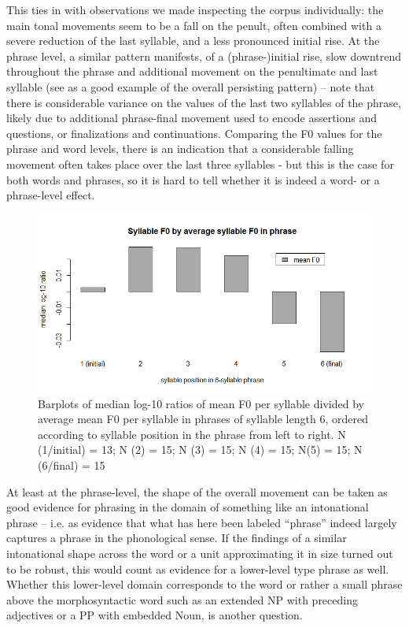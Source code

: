 \documentclass[output=paper]{LSP/langsci}
\begin{document}
This ties in with observations we made inspecting the corpus individually: the main tonal movements seem to be a fall on the penult, often combined with a severe reduction of the last syllable, and a less pronounced initial rise. At the phrase level, a similar pattern manifests, of a (phrase-)initial rise, slow downtrend throughout the phrase and additional movement on the penultimate and last syllable (see   as a good example of the overall persisting pattern) – note that there is considerable variance on the values of the last two syllables of the phrase, likely due to additional phrase-final movement used to encode assertions and questions, or finalizations and continuations. Comparing the F0 values for the phrase and word levels, there is an indication that a considerable falling movement often takes place over the last three syllables - but this is the case for both words and phrases, so it is hard to tell whether it is indeed a word- or a phrase-level effect.

\begin{figure}
\includegraphics[width=\textwidth]{figures/BUC-img5_new.png}
\caption{Barplots of median log-10 ratios of mean F0 per syllable divided by average mean F0 per syllable in phrases of syllable length 6, ordered according to syllable position in the phrase from left to right. N (1/initial) = 13; N (2) = 15; N (3) = 15; N (4) = 15; N(5) = 15; N (6/final) = 15}
\label{fig:buc:5}
\end{figure}

At least at the phrase-level, the shape of the overall movement can be taken as good evidence for phrasing in the domain of something like an intonational phrase – i.e. as evidence that what has here been labeled “phrase” indeed largely captures a phrase in the phonological sense. If the findings of a similar intonational shape across the word or a unit approximating it in size turned out to be robust, this would count as evidence for a lower-level type phrase as well. Whether this lower-level domain corresponds to the word or rather a small phrase above the morphosyntactic word such as an extended NP with preceding adjectives or a PP with embedded Noun, is another question.
\end{document}
